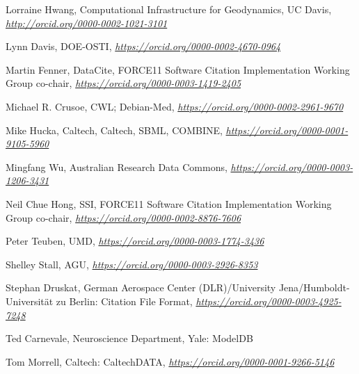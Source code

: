 \documentclass[]{article}
\begin{document}
Lorraine Hwang, Computational Infrastructure for Geodynamics, UC Davis,
\href{http://orcid.org/0000-0002-1021-3101}{\emph{http://orcid.org/0000-0002-1021-3101}}

Lynn Davis, DOE-OSTI, \href{https://orcid.org/0000-0002-4670-0964}{\emph{https://orcid.org/0000-0002-4670-0964}}

Martin Fenner, DataCite, FORCE11 Software Citation Implementation
Working Group co-chair,
\href{https://orcid.org/0000-0003-1419-2405}{\emph{https://orcid.org/0000-0003-1419-2405}}

Michael R. Crusoe, CWL; Debian-Med,
\href{https://orcid.org/0000-0002-2961-9670}{\emph{https://orcid.org/0000-0002-2961-9670}}

Mike Hucka, Caltech, Caltech, SBML, COMBINE,
\href{https://orcid.org/0000-0001-9105-5960}{\emph{https://orcid.org/0000-0001-9105-5960}}

Mingfang Wu, Australian Research Data Commons,
\href{https://orcid.org/0000-0003-1206-3431}{\emph{https://orcid.org/0000-0003-1206-3431}}

Neil Chue Hong, SSI, FORCE11 Software Citation Implementation Working
Group co-chair,
\href{https://orcid.org/0000-0002-8876-7606}{\emph{https://orcid.org/0000-0002-8876-7606}}

Peter Teuben, UMD,
\href{https://orcid.org/0000-0003-1774-3436}{\emph{https://orcid.org/0000-0003-1774-3436}}

Shelley Stall, AGU,
\href{https://orcid.org/0000-0003-2926-8353}{\emph{https://orcid.org/0000-0003-2926-8353}}

Stephan Druskat, German Aerospace Center (DLR)/University
Jena/Humboldt-Universität zu Berlin: Citation File Format,
\href{https://orcid.org/0000-0003-4925-7248}{\emph{https://orcid.org/0000-0003-4925-7248}}

Ted Carnevale, Neuroscience Department, Yale: ModelDB

Tom Morrell, Caltech: CaltechDATA,
\href{https://orcid.org/0000-0001-9266-5146}{\emph{https://orcid.org/0000-0001-9266-5146}}
\end{document}
